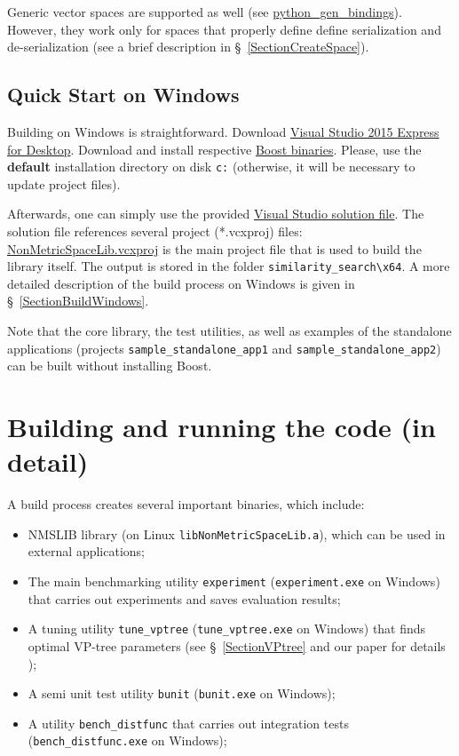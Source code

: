 \documentclass[runningheads,a4paper]{llncs}
\newcommand{\replocfile}{https://github.com/searchivarius/NonMetricSpaceLib/blob/pserv/}
\newcommand{\ttt}[1]{\texttt{#1}}
\begin{document}
{Generic vector spaces are supported as well (see \href{\replocfile python_gen_bindings}{python\_gen\_bindings}). However, they work only for spaces
that properly define define serialization and de-serialization (see a brief description in \S~\ref{SectionCreateSpace}).

\subsection{Quick Start on Windows}\label{QuickStartWindows}
Building on Windows is straightforward.
Download \href{https://www.visualstudio.com/en-us/downloads/download-visual-studio-vs.aspx}{Visual Studio 2015 Express for Desktop}. 
Download and install respective \href{http://sourceforge.net/projects/boost/files/boost-binaries/1.59.0/boost_1_59_0-msvc-14.0-64.exe/download}{Boost binaries}. Please, use the \textbf{default} installation directory on disk \ttt{c:} (otherwise, it will be necessary to update project files).

Afterwards, one can simply use the provided \href{\replocfile similarity_search/NonMetricSpaceLib.sln}{Visual Studio 
solution file}.
The solution file references several project (*.vcxproj) files: 
\href{\replocfile similarity_search/src/NonMetricSpaceLib.vcxproj}{NonMetricSpaceLib.vcxproj}
is the main project file that is used to build the library itself.
The output is stored in the folder \ttt{similarity\_search\textbackslash x64}.
A more detailed description of the build process on Windows is given in \S~\ref{SectionBuildWindows}.

Note that the core library, the test utilities,
 as well as examples of the standalone applications (projects \ttt{sample\_standalone\_app1}
and \ttt{sample\_standalone\_app2})
can be built without installing Boost. 


\section{Building and running the code (in detail)}

A build process creates several important binaries, which include:

\begin{itemize}
\item NMSLIB library (on Linux \ttt{libNonMetricSpaceLib.a}),
which can be used in external applications;
\item The main benchmarking utility \ttt{experiment} (\ttt{experiment.exe} on Windows) 
that carries out experiments and saves evaluation results;
\item A tuning utility \ttt{tune\_vptree} (\ttt{tune\_vptree.exe} on Windows) 
that finds optimal VP-tree parameters (see \S~\ref{SectionVPtree} and our paper for details \cite{Boytsov_and_Bilegsaikhan:nips2013});
\item A semi unit test utility \ttt{bunit} (\ttt{bunit.exe} on Windows);
\item A utility \ttt{bench\_distfunc} that carries out integration tests (\ttt{bench\_distfunc.exe} on  Windows);
\end{itemize}

}
\end{document}
